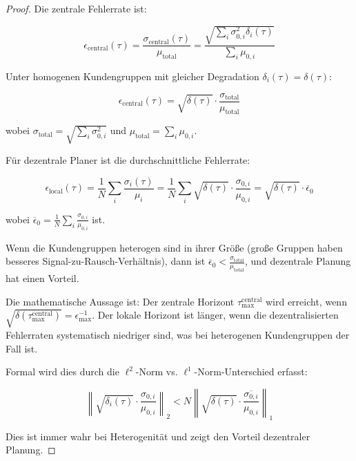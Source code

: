 \documentclass[12pt, a4paper, titlepage]{report}
\theoremstyle{definition}
\theoremstyle{remark}
\begin{document}
\begin{proof}
Die zentrale Fehlerrate ist:

\begin{equation}
\epsilon_{\text{central}}(\tau) = \frac{\sigma_{\text{central}}(\tau)}{\mu_{\text{total}}} = \frac{\sqrt{\sum_i \sigma_{0,i}^2 \delta_i(\tau)}}{\sum_i \mu_{0,i}}
\end{equation}

Unter homogenen Kundengruppen mit gleicher Degradation $\delta_i(\tau) = \delta(\tau)$:

\begin{equation}
\epsilon_{\text{central}}(\tau) = \sqrt{\delta(\tau)} \cdot \frac{\sigma_{\text{total}}}{\mu_{\text{total}}}
\end{equation}

wobei $\sigma_{\text{total}} = \sqrt{\sum_i \sigma_{0,i}^2}$ und $\mu_{\text{total}} = \sum_i \mu_{0,i}$.

Für dezentrale Planer ist die durchschnittliche Fehlerrate:

\begin{equation}
\epsilon_{\text{local}}(\tau) = \frac{1}{N} \sum_i \frac{\sigma_i(\tau)}{\mu_i} = \frac{1}{N} \sum_i \sqrt{\delta(\tau)} \cdot \frac{\sigma_{0,i}}{\mu_{0,i}} = \sqrt{\delta(\tau)} \cdot \overline{\epsilon}_0
\end{equation}

wobei $\overline{\epsilon}_0 = \frac{1}{N}\sum_i \frac{\sigma_{0,i}}{\mu_{0,i}}$ ist.

Wenn die Kundengruppen heterogen sind in ihrer Größe (große Gruppen haben besseres Signal-zu-Rausch-Verhältnis), dann ist $\overline{\epsilon}_0 < \frac{\sigma_{\text{total}}}{\mu_{\text{total}}}$, und dezentrale Planung hat einen Vorteil.

Die mathematische Aussage ist: Der zentrale Horizont $\tau_{\max}^{\text{central}}$ wird erreicht, wenn $\sqrt{\delta(\tau_{\max}^{\text{central}})} = \epsilon_{\max}^{-1}$. Der lokale Horizont ist länger, wenn die dezentralisierten Fehlerraten systematisch niedriger sind, was bei heterogenen Kundengruppen der Fall ist.

Formal wird dies durch die $\ell^2$-Norm vs. $\ell^1$-Norm-Unterschied erfasst:

\begin{equation}
\left\| \sqrt{\delta_i(\tau)} \cdot \frac{\sigma_{0,i}}{\mu_{0,i}} \right\|_2 < N \left\| \sqrt{\delta(\tau)} \cdot \overline{\frac{\sigma_{0,i}}{\mu_{0,i}}} \right\|_1
\end{equation}

Dies ist immer wahr bei Heterogenität und zeigt den Vorteil dezentraler Planung.
\end{proof}
\end{document}
